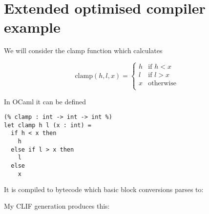 
\cleardoublepage

\nocite{*}
\printbibliography[heading=bibintoc]

\appendix

\cleardoublepage

\chapter{Extended optimised compiler example} \label{appendix-example}

We will consider the clamp function which calculates

\[
    \text{clamp}(h, l, x) = \begin{cases*}
        h & \text{if }h < x  \\
        l & \text{if }l > x  \\
        x & \text{otherwise} \\
    \end{cases*}
\]

In OCaml it can be defined

\begin{verbatim}
(% clamp : int -> int -> int %)
let clamp h l (x : int) =
  if h < x then
    h
  else if l > x then
    l
  else
    x
\end{verbatim}

It is compiled to bytecode which basic block conversions parses to:

% 
% 
% 
% 
% 



My CLIF generation produces this:

